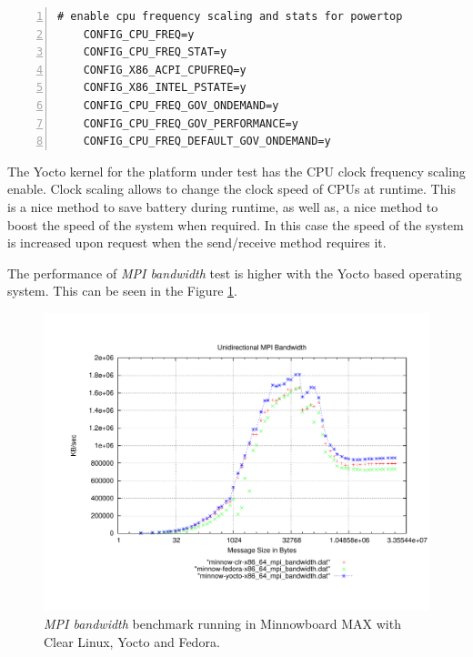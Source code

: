 \begin{minipage}{\textwidth}
\end{minipage}

\begin{minipage}{\textwidth}
\begin{lstlisting}[frame=single,numbers=left]
    # enable cpu frequency scaling and stats for powertop
    CONFIG_CPU_FREQ=y
    CONFIG_CPU_FREQ_STAT=y
    CONFIG_X86_ACPI_CPUFREQ=y
    CONFIG_X86_INTEL_PSTATE=y
    CONFIG_CPU_FREQ_GOV_ONDEMAND=y
    CONFIG_CPU_FREQ_GOV_PERFORMANCE=y
    CONFIG_CPU_FREQ_DEFAULT_GOV_ONDEMAND=y
\end{lstlisting}
\label{kernel_yocto} 
\end{minipage}

\begin{minipage}{\textwidth}
\end{minipage}

The Yocto kernel for the platform under test has the CPU clock frequency
scaling enable. Clock scaling allows to change the clock speed of CPUs at
runtime. This is a nice method to save battery during runtime, as well as, a
nice method to boost the speed of the system when required. In this case the
speed of the system is increased upon request when the send/receive method
requires it.


The performance of \textit{MPI bandwidth} test is higher with the Yocto based
operating system. This can be seen in the Figure \ref{mpi_bandwidth_yocto}.

\begin{figure}
  \includegraphics[width=\paperwidth]{images/mpbench_yocto_experiments/mpi_bandwidth.pdf}
\caption{\textit{MPI bandwidth} benchmark running in Minnowboard MAX with Clear Linux,
Yocto and Fedora.}
\label{mpi_bandwidth_yocto}
\end{figure}


